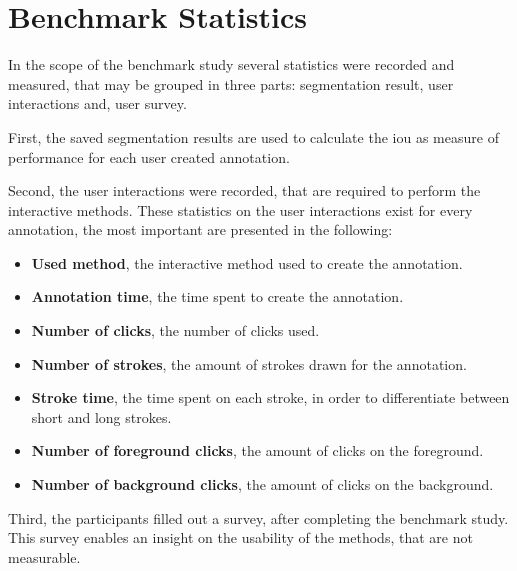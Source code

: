 
\section{Benchmark Statistics}\label{ord:ch4:sec3}

In the scope of the benchmark study several statistics were recorded and measured, that may be grouped in three parts: segmentation result, user interactions and, user survey.

First, the saved segmentation results are used to calculate the \gls{iou} as measure of performance for each user created annotation.

Second, the user interactions were recorded, that are required to perform the interactive methods.
These statistics on the user interactions exist for every annotation, the most important are presented in the following:
\begin{itemize}
	\item \textbf{Used method}, the interactive method used to create the annotation.
	\item \textbf{Annotation time}, the time spent to create the annotation.
	\item \textbf{Number of clicks}, the number of clicks used.
	\item \textbf{Number of strokes}, the amount of strokes drawn for the annotation.
	\item \textbf{Stroke time}, the time spent on each stroke, in order to differentiate between short and long strokes.
	\item \textbf{Number of foreground clicks}, the amount of clicks on the foreground.
	\item \textbf{Number of background clicks}, the amount of clicks on the background.
	
\end{itemize}

Third, the participants filled out a survey, after completing the benchmark study.
This survey enables an insight on the usability of the methods, that are not measurable.

